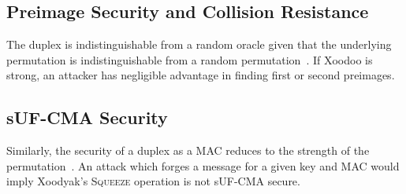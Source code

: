 \subsection{Preimage Security and Collision Resistance}\label{subsec:veil.digest-preimage}

The duplex is indistinguishable from a random oracle given that the underlying permutation is indistinguishable from a
random permutation~\cite[Sec. 8.5]{bertoni2011sponge}.
If Xoodoo is strong, an attacker has negligible advantage in finding first or second preimages.

\subsection{sUF-CMA Security}\label{subsec:veil.digest-suf-cma}

Similarly, the security of a duplex as a MAC reduces to the strength of the
permutation~\cite[Sec. 8.6]{bertoni2011sponge}.
An attack which forges a message for a given key and MAC would imply Xoodyak's \textsc{Squeeze} operation is not sUF-CMA
secure.
